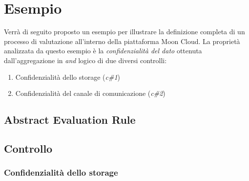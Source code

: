 \documentclass[../main.tex]{subfiles}
\begin{document}
\section{Esempio}

Verrà di seguito proposto un esempio per illustrare la definizione completa di un processo di valutazione all'interno della piattaforma Moon Cloud.
La proprietà analizzata da questo esempio è la \textit{confidenzialità del dato} ottenuta dall'aggregazione in \textit{and} logico di due diversi controlli:
\begin{enumerate}
    \item{Confidenzialità dello storage (\textit{c\#1})}
    \item{Confidenzialità del canale di comunicazione (\textit{c\#2})}
\end{enumerate}

\subsection{Abstract Evaluation Rule}



\subsection{Controllo}

\subsubsection{Confidenzialità dello storage}
\end{document}
